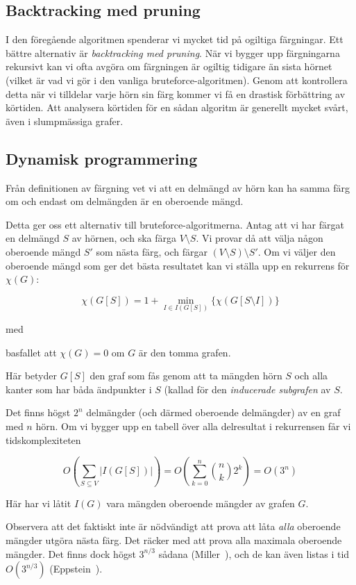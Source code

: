 \documentclass[a4paper]{report}
\begin{document}
\subsection{Backtracking med pruning}
I den föregående algoritmen spenderar vi mycket tid på ogiltiga färgningar. Ett bättre alternativ är \emph{backtracking med pruning}. När vi bygger upp färgningarna rekursivt kan vi ofta avgöra om färgningen är ogiltig tidigare än sista hörnet (vilket är vad vi gör i den vanliga bruteforce-algoritmen). 
Genom att kontrollera detta när vi tilldelar varje hörn sin färg kommer vi få en drastisk förbättring av körtiden. Att analysera körtiden för en sådan algoritm är generellt mycket svårt, även i slumpmässiga grafer.

\subsection{Dynamisk programmering}

Från definitionen av färgning vet vi att en delmängd av hörn kan ha samma färg om och endast om delmängden är en oberoende mängd.

Detta ger oss ett alternativ till bruteforce-algoritmerna. Antag att vi har färgat en delmängd $S$ av hörnen, och ska färga $V \setminus S$. Vi provar då att välja någon oberoende mängd $S'$ som nästa färg, och färgar $(V \setminus S) \setminus S'$. Om vi väljer den oberoende mängd som ger det bästa resultatet kan vi ställa upp en rekurrens för $\chi(G)$:

$$\chi(G[S]) = 1 + \min_{I \in I(G[S])}\{\chi(G[S \setminus I])\}$$

med

basfallet att $\chi(G) = 0$ om $G$ är den tomma grafen.

Här betyder $G[S]$ den graf som fås genom att ta mängden hörn $S$ och alla kanter som har båda ändpunkter i $S$ (kallad för den \emph{inducerade subgrafen} av $S$.

Det finns högst $2^n$ delmängder (och därmed oberoende delmängder) av en graf med $n$ hörn. Om vi bygger upp en tabell över alla delresultat
i rekurrensen får vi tidskomplexiteten

$$O(\sum_{S \subseteq V}{|I(G[S])|}) = O(\sum^n_{k=0}{{n \choose k}2^k}) = O(3^n)$$

Här har vi låtit $I(G)$ vara mängden oberoende mängder av grafen $G$.

Observera att det faktiskt inte är nödvändigt att prova att låta \emph{alla} oberoende mängder utgöra nästa färg. Det räcker med att prova alla maximala oberoende mängder. Det finns dock högst $3^{n/3}$ sådana (Miller~\cite{Miller:1960}), och de kan även listas i tid $O(3^{n/3})$ (Eppstein~\cite{Eppstein:2003}).
\end{document}
